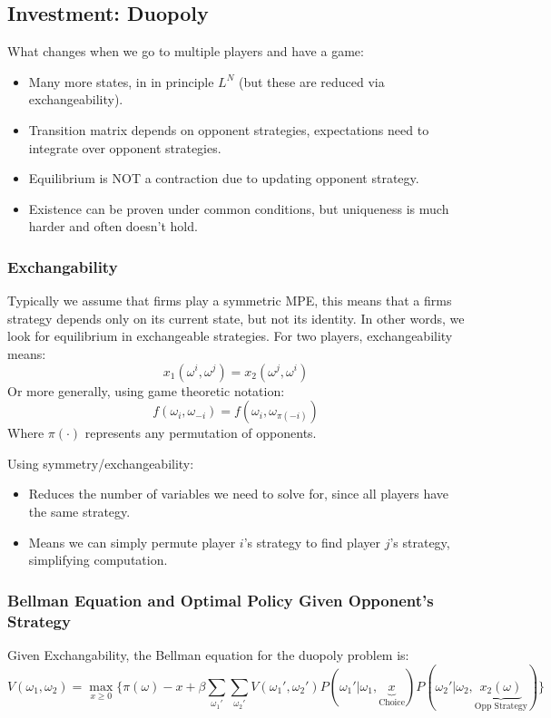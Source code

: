 \documentclass[twoside]{article}
\begin{document}
\subsection{Investment: Duopoly}

What changes when we go to multiple players and have a game: 
\begin{itemize}
\item Many more states, in in principle $L^N$ (but these are reduced via exchangeability). 
\item Transition matrix depends on opponent strategies, expectations need to integrate over opponent strategies. 
\item Equilibrium is NOT a contraction due to updating opponent strategy. 
\item Existence can be proven under common conditions, but uniqueness is much harder and often doesn't hold. 
\end{itemize}

\subsubsection{Exchangability}

Typically we assume that firms play a symmetric MPE, this means that a firms strategy depends only on its current state, but not its identity. 
In other words, we look for equilibrium in exchangeable strategies. For two players, exchangeability means: 
$$ x_1(\omega^i, \omega^j) = x_2(\omega^j, \omega^i)$$
Or more generally, using game theoretic notation: 
$$ f(\omega_i, \omega_{-i}) = f(\omega_i, \omega_{\pi(-i)})$$
Where $\pi(\cdot)$ represents any permutation of opponents. 

Using symmetry/exchangeability: 
\begin{itemize}
\item Reduces the number of variables we need to solve for, since all players have the same strategy. 
\item Means we can simply permute player $i$'s strategy to find player $j$'s strategy, simplifying computation. 
\end{itemize}

\subsubsection{Bellman Equation and Optimal Policy Given Opponent's Strategy}

Given Exchangability, the Bellman equation for the duopoly problem is: 
$$V(\omega_1, \omega_2) = \max_{x \geq 0} \bigg\{ \pi(\omega) - x + \beta \sum_{\omega_1'} \sum_{\omega_2'} V(\omega_1', \omega_2') P(\omega_1'| \omega_1, \underbrace{x}_{\mbox{Choice}}) P(\omega_2'| \omega_2, \underbrace{x_2(\omega)}_{\mbox{Opp Strategy}}) \bigg\}$$
\end{document}
